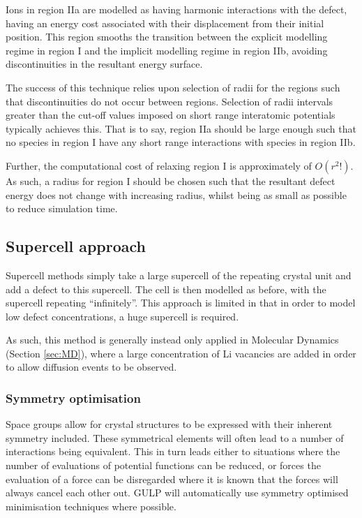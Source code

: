 Ions in region IIa are modelled as having harmonic interactions with the defect, having an energy cost associated with their displacement from their initial position.
This region smooths the transition between the explicit modelling regime in region I and the implicit modelling regime in region IIb, avoiding discontinuities in the resultant energy surface.

The success of this technique relies upon selection of radii for the regions such that discontinuities do not occur between regions.
Selection of radii intervals greater than the cut-off values imposed on short range interatomic potentials typically achieves this.
That is to say, region IIa should be large enough such that no species in region I have any short range interactions with species in region IIb.

Further, the computational cost of relaxing region I is approximately of {\color{red}$O(r^2!)$}.
As such, a radius for region I should be chosen such that the resultant defect energy does not change with increasing radius, whilst being as small as possible to reduce simulation time.

\subsection{Supercell approach}  
Supercell methods simply take a large supercell of the repeating crystal unit and add a defect to this supercell.
The cell is then modelled as before, with the supercell repeating ``infinitely''.
This approach is limited in that in order to model low defect concentrations, a huge supercell is required.

As such, this method is generally instead only applied in Molecular Dynamics (Section \ref{sec:MD}), where a large concentration of Li vacancies are added in order to allow diffusion events to be observed.

\subsubsection{Symmetry optimisation}
Space groups allow for crystal structures to be expressed with their inherent symmetry included.
These symmetrical elements will often lead to a number of interactions being equivalent.
This in turn leads either to situations where the number of evaluations of potential functions can be reduced, or forces the evaluation of a force can be disregarded where it is known that the forces will always cancel each other out.
GULP will automatically use symmetry optimised minimisation techniques where possible.


